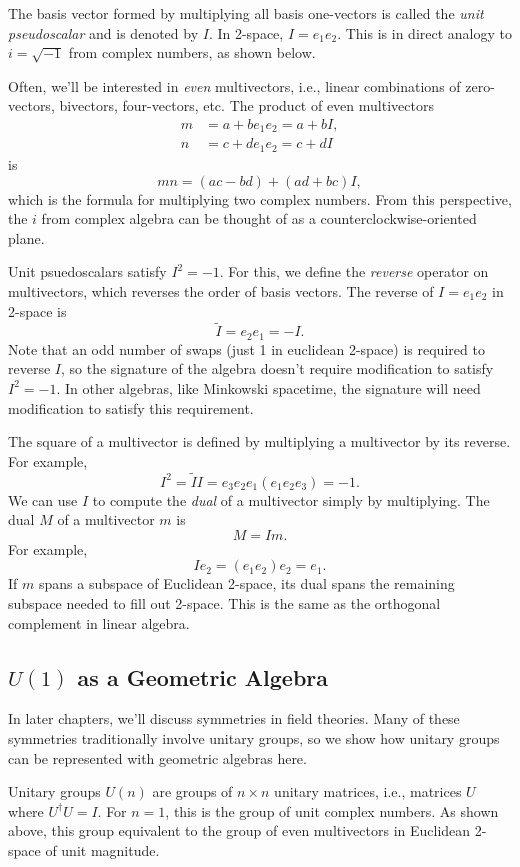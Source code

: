 	The basis vector formed by multiplying all basis one-vectors is called the \emph{unit pseudoscalar} and is denoted by $I$. In 2-space, $I = e_1e_2$. This is in direct analogy to $i = \sqrt{-1}$ from complex numbers, as shown below.
	
	Often, we'll be interested in \emph{even} multivectors, i.e., linear combinations of zero-vectors, bivectors, four-vectors, etc. The product of even multivectors
	\begin{align*}
	m &= a + be_1e_2 = a + bI,\\
	n &= c + de_1e_2 = c + dI
	\end{align*}
	is
	\[
	mn = \left( ac - bd\right)  + \left( ad + bc\right) I,
	\]
	which is the formula for multiplying two complex numbers. From this perspective, the $i$ from complex algebra can be thought of as a counterclockwise-oriented plane.
	
	Unit psuedoscalars satisfy $I^2 = -1$. For this, we define the \emph{reverse} operator on multivectors, which reverses the order of basis vectors. The reverse of $I = e_1e_2$ in 2-space is
	\[
	\tilde{I} = e_2e_1 = -I.
	\]
	Note that an odd number of swaps (just 1 in euclidean 2-space) is required to reverse $I$, so the signature of the algebra doesn't require modification to satisfy $I^2 = -1.$ In other algebras, like Minkowski spacetime, the signature will need modification to satisfy this requirement.
	
	The square of a multivector is defined by multiplying a multivector by its reverse. For example,
	\[
	I^2 = \tilde{I}I = e_3e_2e_1\left( e_1e_2e_3\right)  = -1.
	\]
	We can use $I$ to compute the \emph{dual} of a multivector simply by multiplying. The dual $M$ of a multivector $m$ is
	\[
	M = Im.
	\]
	For example,
	\[
	Ie_2 = \left( e_1e_2\right) e_2 = e_1.
	\]
	If $m$ spans a subspace of Euclidean 2-space, its dual spans the remaining subspace needed to fill out 2-space. This is the same as the orthogonal complement in linear algebra.
	
	\subsection{$U\left( 1\right) $ as a Geometric Algebra}
	In later chapters, we'll discuss symmetries in field theories. Many of these symmetries traditionally involve unitary groups, so we show how unitary groups can be represented with geometric algebras here. 
	
	Unitary groups $U\left( n\right) $ are groups of $n \times n$ unitary matrices, i.e., matrices $U$ where $U^\dagger U = I$. For $n = 1$, this is the group of unit complex numbers. As shown above, this group equivalent to the group of even multivectors in Euclidean 2-space of unit magnitude.
	
